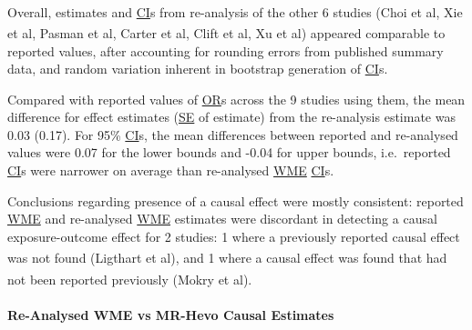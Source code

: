 \documentclass[
]{article}
\begin{document}
Overall, estimates and \hyperref[acronyms_CI]{CI}s from re-analysis of the other 6 studies (Choi et al\textsuperscript{}, Xie et al\textsuperscript{}, Pasman et al\textsuperscript{}, Carter et al\textsuperscript{}, Clift et al\textsuperscript{}, Xu et al\textsuperscript{}) appeared comparable to reported values, after accounting for rounding errors from published summary data, and random variation inherent in bootstrap generation of \hyperref[acronyms_CI]{CI}s.

Compared with reported values of \hyperref[acronyms_OR]{OR}s across the 9 studies using them, the mean difference for effect estimates (\hyperref[acronyms_SE]{SE} of estimate) from the re-analysis estimate was 0.03 (0.17). For 95\% \hyperref[acronyms_CI]{CI}s, the mean differences between reported and re-analysed values were 0.07 for the lower bounds and -0.04 for upper bounds, i.e.~reported \hyperref[acronyms_CI]{CI}s were narrower on average than re-analysed \hyperref[acronyms_WME]{WME} \hyperref[acronyms_CI]{CI}s.

Conclusions regarding presence of a causal effect were mostly consistent: reported \hyperref[acronyms_WME]{WME} and re-analysed \hyperref[acronyms_WME]{WME} estimates were discordant in detecting a causal exposure-outcome effect for 2 studies: 1 where a previously reported causal effect was not found (Ligthart et al\textsuperscript{}), and 1 where a causal effect was found that had not been reported previously (Mokry et al\textsuperscript{}).

\paragraph{Re-Analysed WME vs MR-Hevo Causal Estimates}\label{re-analysed-wme-vs-mr-hevo-causal-estimates}
\end{document}
